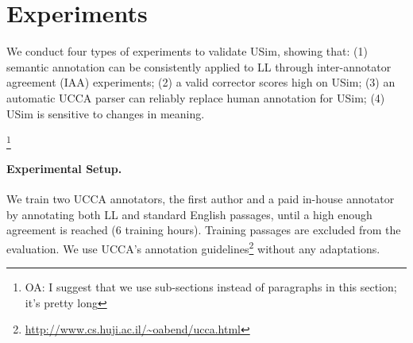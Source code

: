 \documentclass[a4paper, 11pt]{article}
\newcommand{\oa}[1]{\footnote{\color{red}OA: #1}}
\begin{document}
%
%
%

\section{Experiments}


We conduct four types of experiments to validate {\sc USim}, showing that:
(1) semantic annotation can be consistently applied to LL through inter-annotator agreement (IAA) experiments;
(2) a valid corrector scores high on {\sc USim};
(3) an automatic UCCA parser can reliably replace human annotation for {\sc USim};
(4) {\sc USim} is sensitive to changes in meaning.

\oa{I suggest that we use sub-sections instead of paragraphs in this section; it's pretty long}
\paragraph{Experimental Setup.}
We train two UCCA annotators, the first author and a paid in-house annotator by annotating both LL and standard English
passages, until a high enough agreement is reached (6 training hours).
Training passages are excluded from the evaluation.
We use UCCA's annotation
guidelines\footnote{\url{http://www.cs.huji.ac.il/~oabend/ucca.html}}
without any adaptations.
\end{document}
